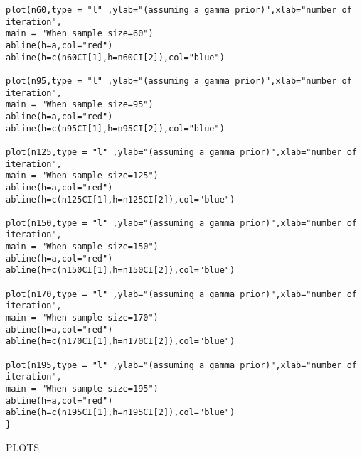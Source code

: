 \documentclass[a4paper,12pt]{report}
\begin{document}
{\begin{verbatim}
plot(n60,type = "l" ,ylab="(assuming a gamma prior)",xlab="number of iteration",
main = "When sample size=60")
abline(h=a,col="red")
abline(h=c(n60CI[1],h=n60CI[2]),col="blue")

plot(n95,type = "l" ,ylab="(assuming a gamma prior)",xlab="number of iteration",
main = "When sample size=95")
abline(h=a,col="red")
abline(h=c(n95CI[1],h=n95CI[2]),col="blue")

plot(n125,type = "l" ,ylab="(assuming a gamma prior)",xlab="number of iteration",
main = "When sample size=125")
abline(h=a,col="red")
abline(h=c(n125CI[1],h=n125CI[2]),col="blue")

plot(n150,type = "l" ,ylab="(assuming a gamma prior)",xlab="number of iteration",
main = "When sample size=150")
abline(h=a,col="red")
abline(h=c(n150CI[1],h=n150CI[2]),col="blue")

plot(n170,type = "l" ,ylab="(assuming a gamma prior)",xlab="number of iteration",
main = "When sample size=170")
abline(h=a,col="red")
abline(h=c(n170CI[1],h=n170CI[2]),col="blue")

plot(n195,type = "l" ,ylab="(assuming a gamma prior)",xlab="number of iteration",
main = "When sample size=195")
abline(h=a,col="red")
abline(h=c(n195CI[1],h=n195CI[2]),col="blue")
}
\end{verbatim}
\newpage
\begin{center}
\large PLOTS
\end{center}
{}\\
\noindent
\begin{minipage}{\linewidth}
	\noindent	{}
\end{minipage}

{}\\
\begin{minipage}{\linewidth}
	\noindent	{}
\end{minipage}

}
\end{document}
